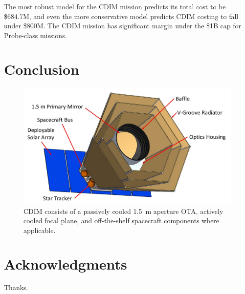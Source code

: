 \documentclass{ws-jai}
\begin{document}
The most robust model for the CDIM mission predicts its total cost to be \$684.7M, and even the more conservative model predicts CDIM costing to fall under \$800M.
The CDIM mission has significant margin under the \$1B cap for Probe-class missions.

\clearpage

\section{Conclusion}
\label{sec:conclusion}
\begin{figure}[htp]
  \includegraphics[width=\linewidth]{figs/cdim_annotated-cartoon}
  \caption{CDIM consists of a passively cooled \SI{1.5}{\meter} aperture OTA, actively cooled focal plane, and off-the-shelf spacecraft components where applicable. }
\label{fig:cdim-annotated}
\end{figure}
\section*{Acknowledgments}
Thanks.


\end{document}
